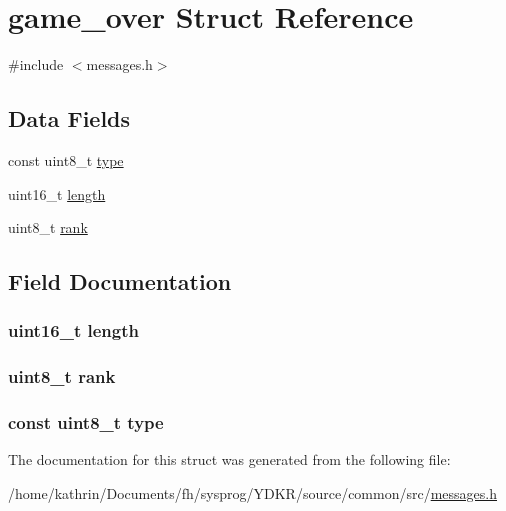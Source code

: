 \hypertarget{structgame__over}{
\section{game\_\-over Struct Reference}
\label{structgame__over}
}


{\ttfamily \#include $<$messages.h$>$}

\subsection*{Data Fields}
\begin{DoxyCompactItemize}
\item 
const uint8\_\-t \hyperlink{structgame__over_aca7dafb0092715a03dd40f45fc607f2a}{type}
\item 
uint16\_\-t \hyperlink{structgame__over_a1892eba2086d12ac2b09005aeb09ea3b}{length}
\item 
uint8\_\-t \hyperlink{structgame__over_a3b6f67f63ff4937bf7ee67d80f49f500}{rank}
\end{DoxyCompactItemize}


\subsection{Field Documentation}
\hypertarget{structgame__over_a1892eba2086d12ac2b09005aeb09ea3b}{
\subsubsection[{length}]{\setlength{\rightskip}{0pt plus 5cm}uint16\_\-t {\bf length}}}
\label{structgame__over_a1892eba2086d12ac2b09005aeb09ea3b}
\hypertarget{structgame__over_a3b6f67f63ff4937bf7ee67d80f49f500}{
\subsubsection[{rank}]{\setlength{\rightskip}{0pt plus 5cm}uint8\_\-t {\bf rank}}}
\label{structgame__over_a3b6f67f63ff4937bf7ee67d80f49f500}
\hypertarget{structgame__over_aca7dafb0092715a03dd40f45fc607f2a}{
\subsubsection[{type}]{\setlength{\rightskip}{0pt plus 5cm}const uint8\_\-t {\bf type}}}
\label{structgame__over_aca7dafb0092715a03dd40f45fc607f2a}


The documentation for this struct was generated from the following file:\begin{DoxyCompactItemize}
\item 
/home/kathrin/Documents/fh/sysprog/YDKR/source/common/src/\hyperlink{messages_8h}{messages.h}\end{DoxyCompactItemize}
